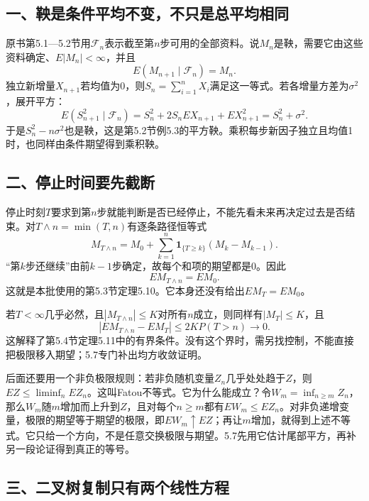 \documentclass[11pt,a4paper,UTF8,fontset=fandol]{ctexart}
\begin{document}
\subsection{一、鞅是条件平均不变，不只是总平均相同}\label{ux4e00ux9785ux662fux6761ux4ef6ux5e73ux5747ux4e0dux53d8ux4e0dux53eaux662fux603bux5e73ux5747ux76f8ux540c}

原书第5.1---5.2节用\(\mathcal F_n\)表示截至第\(n\)步可用的全部资料。说\(M_n\)是鞅，需要它由这些资料确定、\(E|M_n|<\infty\)，并且
\[E(M_{n+1}\mid\mathcal F_n)=M_n.\]
独立新增量\(X_{n+1}\)若均值为0，则\(S_n=\sum_{i=1}^nX_i\)满足这一等式。若各增量方差为\(\sigma^2\)，展开平方：
\[E(S_{n+1}^2\mid\mathcal F_n)=S_n^2+2S_nEX_{n+1}+EX_{n+1}^2=S_n^2+\sigma^2.\]
于是\(S_n^2-n\sigma^2\)也是鞅，这是第5.2节例5.3的平方鞅。乘积每步新因子独立且均值1时，也同样由条件期望得到乘积鞅。

\subsection{二、停止时间要先截断}\label{ux4e8cux505cux6b62ux65f6ux95f4ux8981ux5148ux622aux65ad}

停止时刻\(T\)要求到第\(n\)步就能判断是否已经停止，不能先看未来再决定过去是否结束。对\(T\wedge n=\min(T,n)\)有逐条路径恒等式
\[M_{T\wedge n}=M_0+\sum_{k=1}^n\mathbf1_{\{T\ge k\}}(M_k-M_{k-1}).\]
``第\(k\)步还继续''由前\(k-1\)步确定，故每个和项的期望都是0。因此
\[\boxed{E M_{T\wedge n}=EM_0.}\]
这就是本批使用的第5.3节定理5.10。它本身还没有给出\(EM_T=EM_0\)。

若\(T<\infty\)几乎必然，且\(|M_{T\wedge n}|\le K\)对所有\(n\)成立，则同样有\(|M_T|\le K\)，且
\[|E M_{T\wedge n}-EM_T|\le2K P(T>n)\to0.\]
这解释了第5.4节定理5.11中的有界条件。没有这个界时，需另找控制，不能直接把极限移入期望；5.7专门补出均方收敛证明。

后面还要用一个非负极限规则：若非负随机变量\(Z_n\)几乎处处趋于\(Z\)，则\(EZ\le\liminf_n EZ_n\)。这叫Fatou不等式。它为什么能成立？令\(W_m=\inf_{n\ge m}Z_n\)，那么\(W_m\)随\(m\)增加而上升到\(Z\)，且对每个\(n\ge m\)都有\(EW_m\le EZ_n\)。对非负递增变量，极限的期望等于期望的极限，即\(EW_m\uparrow EZ\)；再让\(m\)增加，就得到上述不等式。它只给一个方向，不是任意交换极限与期望。5.7先用它估计尾部平方，再补另一段论证得到真正的等号。

\subsection{三、二叉树复制只有两个线性方程}\label{ux4e09ux4e8cux53c9ux6811ux590dux5236ux53eaux6709ux4e24ux4e2aux7ebfux6027ux65b9ux7a0b}
\end{document}
